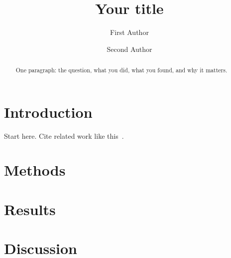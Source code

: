 \documentclass[11pt]{article}
\title{Your title}
\author{First Author \and Second Author}
\date{}
\begin{document}
\maketitle

\begin{abstract}
One paragraph: the question, what you did, what you found, and why it matters.
\end{abstract}

\section{Introduction}
Start here. Cite related work like this~\cite{knuth1984}.

\section{Methods}

\section{Results}

\section{Discussion}



\end{document}
